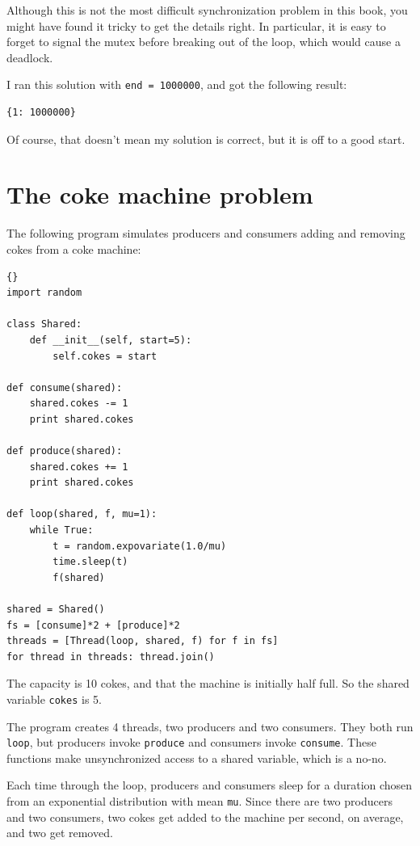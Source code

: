 \documentclass{book}
\newcommand{\clearemptydoublepage}{\newpage\cleardoublepage}
\begin{document}
Although this is not the most difficult synchronization problem
in this book, you might have found it tricky to get the details
right.  In particular, it is easy to forget to signal the mutex
before breaking out of the loop, which would cause a deadlock.

I ran this solution with {\tt end = 1000000}, and got the
following result:

\begin{verbatim}
{1: 1000000}
\end{verbatim}

Of course, that doesn't mean my solution is correct, but it is
off to a good start.


\clearemptydoublepage
\section {The coke machine problem}

The following program simulates producers and consumers
adding and removing cokes from a coke machine:

\begin{lstlisting}[title={}]{}
import random

class Shared:
    def __init__(self, start=5):
        self.cokes = start

def consume(shared):
    shared.cokes -= 1
    print shared.cokes

def produce(shared):
    shared.cokes += 1
    print shared.cokes

def loop(shared, f, mu=1):
    while True:
        t = random.expovariate(1.0/mu)
        time.sleep(t)
        f(shared)

shared = Shared()
fs = [consume]*2 + [produce]*2 
threads = [Thread(loop, shared, f) for f in fs]
for thread in threads: thread.join()
\end{lstlisting}

The capacity is 10 cokes, and that the machine is initially
half full.  So the shared variable {\tt cokes} is 5.

The program creates 4 threads, two producers and two consumers.
They both run {\tt loop}, but producers invoke {\tt produce}
and consumers invoke {\tt consume}.  These functions make
unsynchronized access to a shared variable, which is a no-no.

Each time through the loop, producers and consumers sleep for a
duration chosen from an exponential distribution with mean {\tt mu}.
Since there are two producers and two consumers, two cokes get added
to the machine per second, on average, and two get removed.
\end{document}
